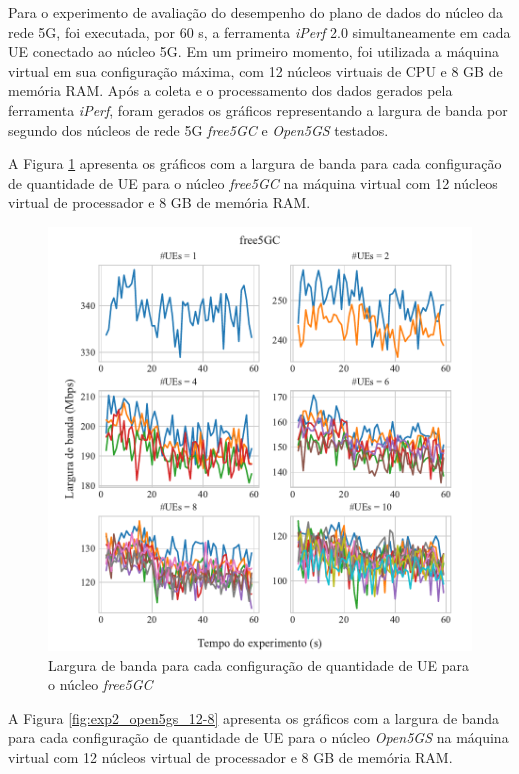 Para o experimento de avaliação do desempenho do plano de dados do núcleo da rede 5G, foi executada, por 60 s, a ferramenta \textit{iPerf} 2.0 simultaneamente em cada UE conectado ao núcleo 5G.
Em um primeiro momento, foi utilizada a máquina virtual em sua configuração máxima, com 12 núcleos virtuais de CPU e 8 GB de memória RAM.
Após a coleta e o processamento dos dados gerados pela ferramenta \textit{iPerf}, foram gerados os gráficos representando a largura de banda por segundo dos núcleos de rede 5G \textit{free5GC} e \textit{Open5GS} testados.

A Figura \ref{fig:exp2_free5gc_12-8} apresenta os gráficos com a largura de banda para cada configuração de quantidade de UE para o núcleo \textit{free5GC} na máquina virtual com 12 núcleos virtual de processador e 8 GB de memória RAM.

\begin{figure}[H]
    \centering
    \includegraphics[width=1\textwidth]{TG2/Chapters/DataAnalysis/Figures/EXP2-free5GC-12C-8GB.pdf}
    \caption{Largura de banda para cada configuração de quantidade de UE para o núcleo \textit{free5GC}}
    \label{fig:exp2_free5gc_12-8}
\end{figure}

A Figura \ref{fig:exp2_open5gs_12-8} apresenta os gráficos com a largura de banda para cada configuração de quantidade de UE para o núcleo \textit{Open5GS} na máquina virtual com 12 núcleos virtual de processador e 8 GB de memória RAM.

